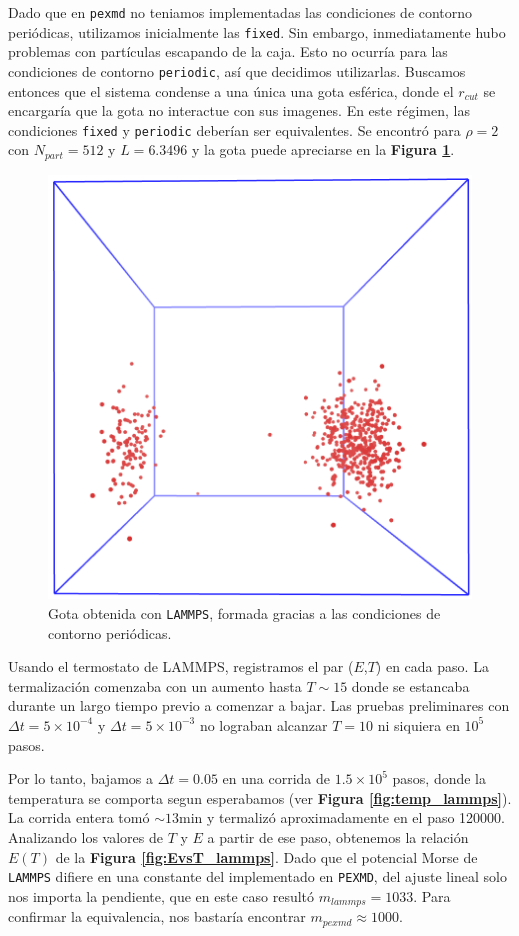 \documentclass[twoside, 12pt]{article}
\begin{document}
Dado que en \texttt{pexmd} no teniamos implementadas las condiciones de contorno periódicas, utilizamos inicialmente las \texttt{fixed}. 
Sin embargo, inmediatamente hubo problemas con partículas escapando de la caja. Esto no ocurría para las condiciones de contorno \texttt{periodic}, así que decidimos utilizarlas. 
Buscamos entonces que el sistema condense a una única una gota esférica, donde el $r_{cut}$ se encargaría que la gota no interactue con sus imagenes. 
En este régimen, las condiciones \texttt{fixed} y \texttt{periodic} deberían ser equivalentes. 
Se encontró para $\rho=2$ con $N_{part}=512$ y $L=6.3496$ y la gota puede apreciarse en la \textbf{Figura \ref{fig:gota}}.

\begin{figure}[h]
	\centering
	\includegraphics[width=0.5\columnwidth]{gota.png}
	\caption{Gota obtenida con \texttt{LAMMPS}, formada gracias a las condiciones de contorno periódicas.}
	\label{fig:gota}
\end{figure}

Usando el termostato de LAMMPS, registramos el par ($E$,$T$) en cada paso. La termalización comenzaba con un aumento hasta $T\sim 15$ donde se estancaba durante un largo tiempo previo a comenzar a bajar. Las pruebas 
preliminares con $\Delta t= 5\times 10^{-4}$ y $\Delta t= 5\times 10^{-3}$ no lograban alcanzar $T=10$ ni siquiera en $10^5$ pasos.

Por lo tanto, bajamos a $\Delta t = 0.05$ en una corrida de $1.5\times10^{5}$ pasos, donde la temperatura se comporta segun esperabamos (ver \textbf{Figura \ref{fig:temp_lammps}}). La corrida entera tomó $\sim 13$min y 
termalizó aproximadamente en el paso 120000. 
Analizando los valores de $T$ y $E$ a partir de ese paso, obtenemos la relación $E(T)$ de la \textbf{Figura \ref{fig:EvsT_lammps}}. Dado que el potencial Morse de \texttt{LAMMPS} difiere en una constante del implementado
en \texttt{PEXMD}, del ajuste lineal solo nos importa la pendiente, que en este caso resultó $m_{lammps}=1033$. Para confirmar la equivalencia, nos bastaría encontrar $m_{pexmd}\approx 1000$.
\end{document}
